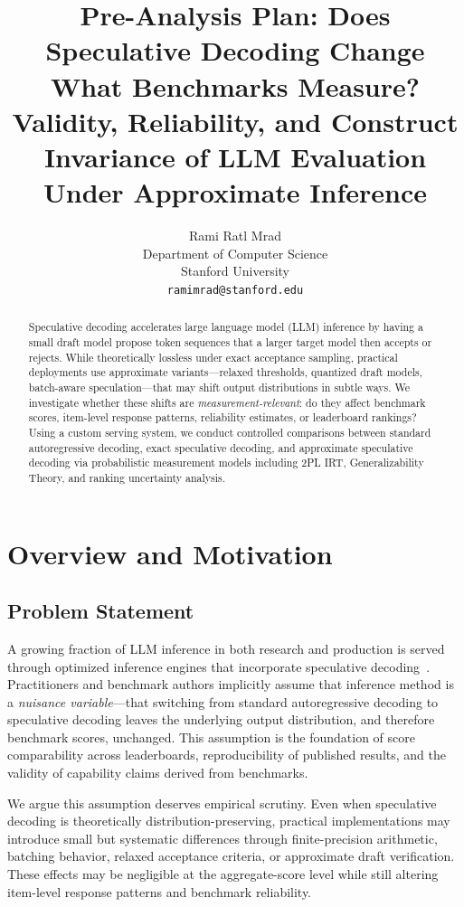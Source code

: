 \documentclass{article}
\title{Pre-Analysis Plan: Does Speculative Decoding Change What Benchmarks Measure?\\
\large Validity, Reliability, and Construct Invariance of LLM Evaluation Under Approximate Inference}
\author{%
  Rami Ratl Mrad\\
  Department of Computer Science\\
  Stanford University\\
  \texttt{ramimrad@stanford.edu}
}
\begin{document}
\maketitle

\begin{abstract}
Speculative decoding accelerates large language model (LLM) inference by having a small draft model propose token sequences that a larger target model then accepts or rejects. While theoretically lossless under exact acceptance sampling, practical deployments use approximate variants---relaxed thresholds, quantized draft models, batch-aware speculation---that may shift output distributions in subtle ways. We investigate whether these shifts are \emph{measurement-relevant}: do they affect benchmark scores, item-level response patterns, reliability estimates, or leaderboard rankings? Using a custom serving system, we conduct controlled comparisons between standard autoregressive decoding, exact speculative decoding, and approximate speculative decoding via probabilistic measurement models including 2PL IRT, Generalizability Theory, and ranking uncertainty analysis.
\end{abstract}

\section{Overview and Motivation}

\subsection{Problem Statement}

A growing fraction of LLM inference in both research and production is served through optimized inference engines that incorporate speculative decoding~\citep{leviathan2023fast, chen2023accelerating}. Practitioners and benchmark authors implicitly assume that inference method is a \emph{nuisance variable}---that switching from standard autoregressive decoding to speculative decoding leaves the underlying output distribution, and therefore benchmark scores, unchanged. This assumption is the foundation of score comparability across leaderboards, reproducibility of published results, and the validity of capability claims derived from benchmarks.

We argue this assumption deserves empirical scrutiny. Even when speculative decoding is theoretically distribution-preserving, practical implementations may introduce small but systematic differences through finite-precision arithmetic, batching behavior, relaxed acceptance criteria, or approximate draft verification. These effects may be negligible at the aggregate-score level while still altering item-level response patterns and benchmark reliability.
\end{document}
